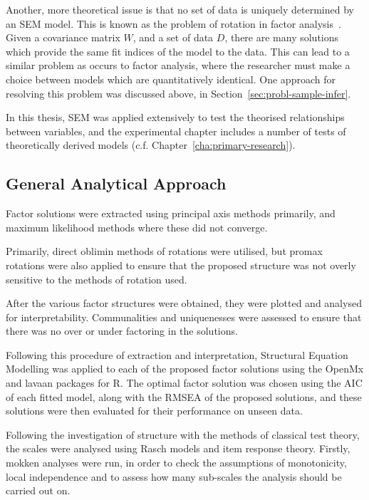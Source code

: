 Another, more theoretical issue is that no set of data is uniquely determined by an SEM model. This is known as the problem of rotation in factor analysis~\cite{maccallum2000applications}. Given a covariance matrix $W$, and a set of data $D$, there are many solutions which provide the same fit indices of the model to the data. This can lead to a similar problem as occurs to factor analysis, where the researcher must make a choice between models which are quantitatively identical. One approach for resolving this problem was discussed above, in Section~\ref{sec:probl-sample-infer}.

In this thesis, SEM was applied extensively to test the theorised relationships between variables, and the experimental chapter includes a number of tests of theoretically derived models (c.f. Chapter~\ref{cha:primary-research}).

\subsection{General Analytical Approach}
\label{sec:gener-analyt-appr}




Factor solutions were extracted using principal axis methods primarily, and maximum likelihood methods where these did not converge.

Primarily, direct oblimin methods of rotations were utilised, but promax rotations were also applied to ensure that the proposed structure was not overly sensitive to the methods of rotation used.

After the various factor structures were obtained, they were plotted and analysed for interpretability. Communalities and uniquenesses were assessed to ensure that there was no over or under factoring in the solutions. %

Following this procedure of extraction and interpretation, Structural Equation Modelling was applied to each of the proposed factor solutions using the OpenMx and lavaan packages for R. The optimal factor solution was chosen using the AIC of each fitted model, along with the RMSEA of the proposed solutions, and these solutions were then evaluated for their performance on unseen data. 


Following the investigation of structure with the methods of classical test theory, the scales were analysed using Rasch models and item response theory. Firstly, mokken analyses were run, in order to check the assumptions of monotonicity, local independence and to assess how many sub-scales the analysis should be carried out on. 

